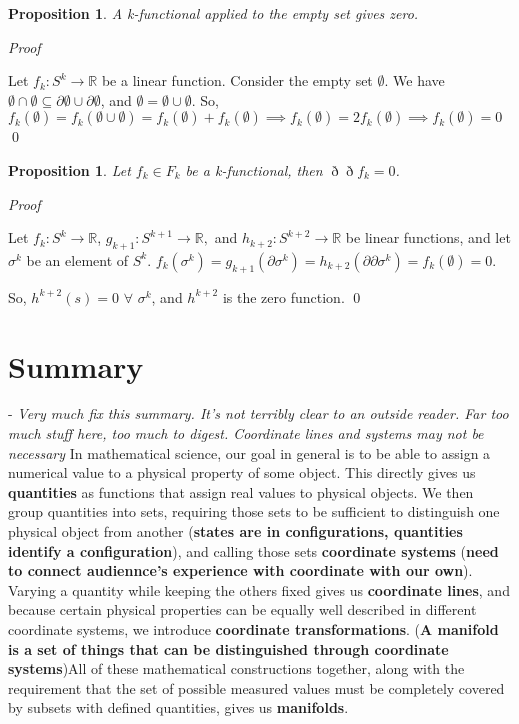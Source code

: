 \documentclass{book}
\newtheorem{prop}[equation]{Proposition}
\renewenvironment{proof}{\emph{Proof}}{\qed}
\begin{document}
\begin{prop}
	A k-functional applied to the empty set gives zero. 
\end{prop}
\begin{proof}
	
	Let $f_k : S^k \to \mathbb{R}$ be a linear function. Consider the empty set $\emptyset$. 
We have $\emptyset \cap \emptyset \subseteq \partial\emptyset \cup \partial\emptyset$, and $\emptyset = \emptyset\cup\emptyset$. 
So, $f_k(\emptyset) = f_k(\emptyset\cup\emptyset) = f_k(\emptyset) + f_k(\emptyset) \implies f_k(\emptyset) = 2f_k(\emptyset) \implies f_k(\emptyset) = 0$
\end{proof}



\begin{prop}
	Let $f_k \in F_k$ be a k-functional, then $\eth\eth f_k = 0 $.
	
	
\end{prop}
\begin{proof}

	Let $f_k : S^k \to \mathbb{R}$, $g_{k+1} : S^{k+1} \to \mathbb{R},$ and $h_{k+2}: S^{k+2} \to \mathbb{R}$ be linear functions, and let $\sigma^k$ be an element of $S^k$. $f_k(\sigma^k) = g_{k+1}(\partial \sigma^k) = h_{k+2}(\partial\partial \sigma^k) = f_k(\emptyset) = 0$. 
	
	So, $h^{k+2}(s) = 0$ $\forall$ $\sigma^k$, and $h^{k+2}$ is the zero function. 
\end{proof}

\section{Summary}


- \emph{Very much fix this summary. It's not terribly clear to an outside reader. Far too much stuff here, too much to digest. Coordinate lines and systems may not be necessary}
In mathematical science, our goal in general is to be able to assign a numerical value to a physical property of some object. This directly gives us \textbf{quantities} as functions that assign real values to physical objects. We then group quantities into sets, requiring those sets to be sufficient to distinguish one physical object from another (\textbf{states are in configurations, quantities identify a configuration}), and calling those sets \textbf{coordinate systems} (\textbf{need to connect audiennce's experience with coordinate with our own}). Varying a quantity while keeping the others fixed gives us \textbf{coordinate lines}, and because certain physical properties can be equally well described in different coordinate systems, we introduce \textbf{coordinate transformations}. (\textbf{A manifold is a set of things that can be distinguished through coordinate systems})All of these mathematical constructions together, along with the requirement that the set of possible measured values must be completely covered by subsets with defined quantities, gives us \textbf{manifolds}. 
\end{document}
